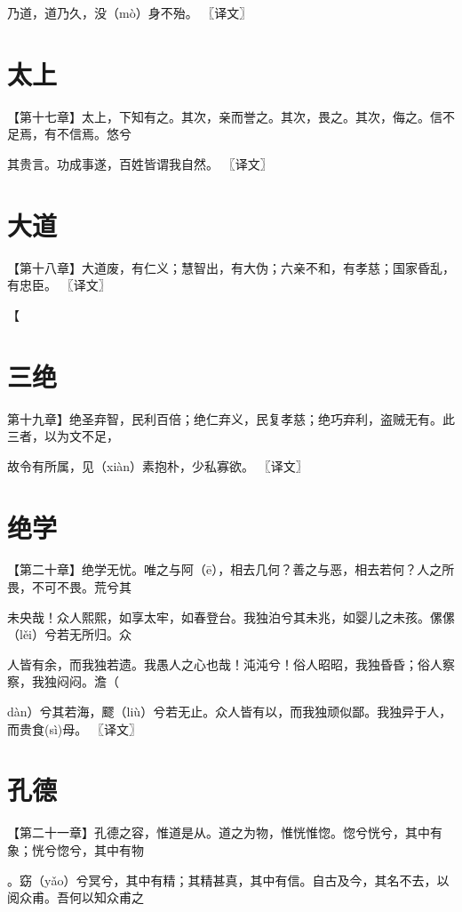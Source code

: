 \documentclass[a4paper,12pt,UTF8,twoside]{ctexbook}
\begin{document}
	乃道，道乃久，没（mò）身不殆。 〖译文〗
	
	

	
	
	
	\chapter{太上}
	【第十七章】太上，下知有之。其次，亲而誉之。其次，畏之。其次，侮之。信不足焉，有不信焉。悠兮
	
	其贵言。功成事遂，百姓皆谓我自然。 〖译文〗
	
	\chapter{大道}
	
	【第十八章】大道废，有仁义；慧智出，有大伪；六亲不和，有孝慈；国家昏乱，有忠臣。 〖译文〗
	
	
	
	【
	
	\chapter{三绝}
	
	第十九章】绝圣弃智，民利百倍；绝仁弃义，民复孝慈；绝巧弃利，盗贼无有。此三者，以为文不足，
	
	故令有所属，见（xiàn）素抱朴，少私寡欲。 〖译文〗
	
	
	
	
	\chapter{绝学}
	【第二十章】绝学无忧。唯之与阿（ē），相去几何？善之与恶，相去若何？人之所畏，不可不畏。荒兮其
	
	未央哉！众人熙熙，如享太牢，如春登台。我独泊兮其未兆，如婴儿之未孩。傫傫（lěi）兮若无所归。众
	
	人皆有余，而我独若遗。我愚人之心也哉！沌沌兮！俗人昭昭，我独昏昏；俗人察察，我独闷闷。澹（
	
	dàn）兮其若海，飂（liù）兮若无止。众人皆有以，而我独顽似鄙。我独异于人，而贵食(sì)母。 〖译文〗
	
	
	
	
	\chapter{孔德}
	【第二十一章】孔德之容，惟道是从。道之为物，惟恍惟惚。惚兮恍兮，其中有象；恍兮惚兮，其中有物
	
	。窈（yǎo）兮冥兮，其中有精；其精甚真，其中有信。自古及今，其名不去，以阅众甫。吾何以知众甫之
	
\end{document}
